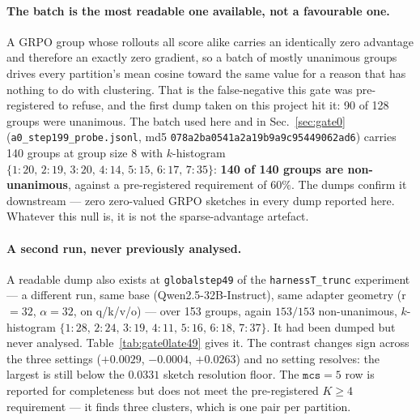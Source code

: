 \paragraph{The batch is the most readable one available, not a favourable one.} A GRPO group
whose rollouts all score alike carries an identically zero advantage and therefore an exactly
zero gradient, so a batch of mostly unanimous groups drives every partition's mean cosine
toward the same value for a reason that has nothing to do with clustering. That is the
false-negative this gate was pre-registered to refuse, and the first dump taken on this project
hit it: 90 of 128 groups were unanimous. The batch used here and in Sec.~\ref{sec:gate0}
(\texttt{a0\_step199\_probe.jsonl}, md5 \texttt{078a2ba0541a2a19b9a9c95449062ad6}) carries 140
groups at group size $8$ with $k$-histogram $\{1{:}20,\,2{:}19,\,3{:}20,\,4{:}14,\,5{:}15,\,
6{:}17,\,7{:}35\}$: \textbf{140 of 140 groups are non-unanimous}, against a pre-registered
requirement of $60\%$. The dumps confirm it downstream --- zero zero-valued GRPO sketches in
every dump reported here. Whatever this null is, it is not the sparse-advantage artefact.

\paragraph{A second run, never previously analysed.} A readable dump also exists at
\texttt{globalstep49} of the \texttt{harnessT\_trunc} experiment --- a different run, same base
(Qwen2.5-32B-Instruct), same adapter geometry (r$=32$, $\alpha=32$, on q/k/v/o) --- over 153
groups, again $153/153$ non-unanimous, $k$-histogram $\{1{:}28,\,2{:}24,\,3{:}19,\,4{:}11,\,
5{:}16,\,6{:}18,\,7{:}37\}$. It had been dumped but never analysed. Table~\ref{tab:gate0late49}
gives it. The contrast changes sign across the three settings ($+0.0029$, $-0.0004$, $+0.0263$)
and no setting resolves: the largest is still below the $0.0331$ sketch resolution floor. The
$\texttt{mcs}=5$ row is reported for completeness but does not meet the pre-registered
$K\ge 4$ requirement --- it finds three clusters, which is one pair per partition.


